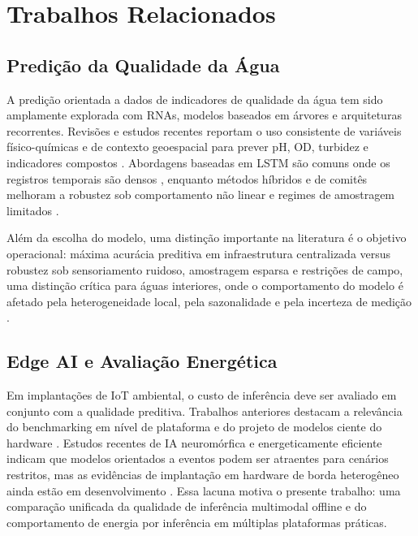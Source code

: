 \section{Trabalhos Relacionados}

\subsection{Predição da Qualidade da Água}
A predição orientada a dados de indicadores de qualidade da água tem sido amplamente explorada com RNAs, modelos baseados em árvores e arquiteturas recorrentes. Revisões e estudos recentes reportam o uso consistente de variáveis físico-químicas e de contexto geoespacial para prever pH, OD, turbidez e indicadores compostos \cite{yan2024,ahmed2019,aladhaileh2021,pan2025}. Abordagens baseadas em LSTM são comuns onde os registros temporais são densos \cite{liu2019,pyo2023,qi2020}, enquanto métodos híbridos e de comitês melhoram a robustez sob comportamento não linear e regimes de amostragem limitados \cite{wu2022,chadalavada2025,kalaivanan2022,palani2008}.

Além da escolha do modelo, uma distinção importante na literatura é o objetivo operacional: máxima acurácia preditiva em infraestrutura centralizada versus robustez sob sensoriamento ruidoso, amostragem esparsa e restrições de campo, uma distinção crítica para águas interiores, onde o comportamento do modelo é afetado pela heterogeneidade local, pela sazonalidade e pela incerteza de medição \cite{yan2024,lowe2022,rahu2023}.

\subsection{Edge AI e Avaliação Energética}
Em implantações de IoT ambiental, o custo de inferência deve ser avaliado em conjunto com a qualidade preditiva. Trabalhos anteriores destacam a relevância do benchmarking em nível de plataforma e do projeto de modelos ciente do hardware \cite{rosero2020,zulkifli2022,lamrini2024,elshafeiy2023}. Estudos recentes de IA neuromórfica e energeticamente eficiente indicam que modelos orientados a eventos podem ser atraentes para cenários restritos, mas as evidências de implantação em hardware de borda heterogêneo ainda estão em desenvolvimento \cite{aral2024,azadi2025,huijbregts2024,aribe2025future}. Essa lacuna motiva o presente trabalho: uma comparação unificada da qualidade de inferência multimodal offline e do comportamento de energia por inferência em múltiplas plataformas práticas.

